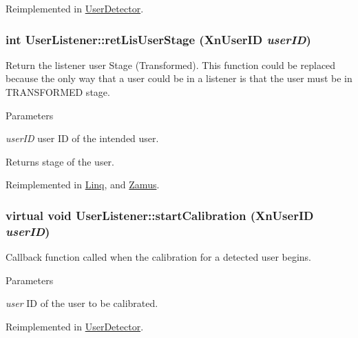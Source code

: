 Reimplemented in \hyperlink{classUserDetector_aa1aca77e875b9ab9b2b0b29d55672885}{UserDetector}.

\hypertarget{classUserListener_ad28b54b309b207f197ed238263d1014e}{
\subsubsection[{retLisUserStage}]{\setlength{\rightskip}{0pt plus 5cm}int UserListener::retLisUserStage (XnUserID {\em userID})}}
\label{classUserListener_ad28b54b309b207f197ed238263d1014e}
Return the listener user Stage (Transformed). This function could be replaced because the only way that a user could be in a listener is that the user must be in TRANSFORMED stage. 
\begin{DoxyParams}{Parameters}
\item[{\em userID}]user ID of the intended user. \end{DoxyParams}
\begin{DoxyReturn}{Returns}
stage of the user. 
\end{DoxyReturn}


Reimplemented in \hyperlink{classLinq_a6994af326a734f473eae3983b32a5148}{Linq}, and \hyperlink{classZamus_a727befa3608295027c9db889af9556c1}{Zamus}.

\hypertarget{classUserListener_ae54282ac916fa8e2735b69a4d474c73a}{
\subsubsection[{startCalibration}]{\setlength{\rightskip}{0pt plus 5cm}virtual void UserListener::startCalibration (XnUserID {\em userID})}}
\label{classUserListener_ae54282ac916fa8e2735b69a4d474c73a}
Callback function called when the calibration for a detected user begins. 
\begin{DoxyParams}{Parameters}
\item[{\em user}]ID of the user to be calibrated. \end{DoxyParams}


Reimplemented in \hyperlink{classUserDetector_a2681776dca3ec63bfc77528504354512}{UserDetector}.



